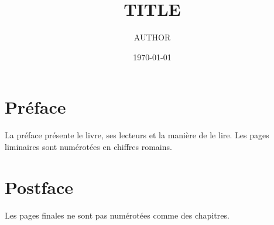 \documentclass[11pt]{book}
\title{{{TITLE}}}
\author{{{AUTHOR}}}
\date{\today}
\begin{document}
\frontmatter
\maketitle

\chapter*{Préface}

La préface présente le livre, ses lecteurs et la manière de le lire. Les
pages liminaires sont numérotées en chiffres romains.

\tableofcontents

\mainmatter



\backmatter
\chapter*{Postface}

Les pages finales ne sont pas numérotées comme des chapitres.
\end{document}
